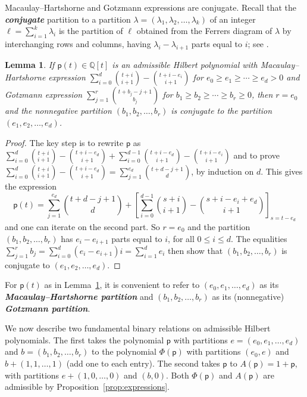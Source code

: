 \documentclass[12pt]{amsart}%
\newtheorem{lemma}[theorem]{Lemma}
\theoremstyle{definition}%
\newcommand{\hp}{\mathsf{p}}%
\newcommand{\lift}{\Phi}%
\newcommand{\plus}{A}%
\newcommand{\QQ}{\mathbb{Q}}%
\begin{document}
Macaulay--Hartshorne and Gotzmann expressions are conjugate.  Recall
that the \emph{\bfseries conjugate} partition to a partition
$\lambda = \left( \lambda_1, \lambda_2, \dotsc, \lambda_k \right)$ of
an integer $\ell = \sum_{i=1}^k \lambda_i$ is the partition of $\ell$
obtained from the Ferrers diagram of $\lambda$ by interchanging rows
and columns, having $\lambda_i - \lambda_{i+1}$ parts equal to $i$;
see \cite[Section~1.8]{Stanley--2012}.

\begin{lemma}
  \label{lem:dictionary}
  If $\hp(t) \in \QQ[t]$ is an admissible Hilbert polynomial with
  Macaulay--Hartshorne expression
  $\sum_{i=0}^d \binom{t+i}{i+1} - \binom{t+i -e_i}{i+1}$ for
  $e_0 \ge e_1 \ge \dotsb \ge e_d > 0$ and Gotzmann expression
  $\sum_{j=1}^r \binom{t + b_j - j+1}{b_j}$ for
  $b_1 \ge b_2 \ge \dotsb \ge b_r \ge 0$, then $r = e_0$ and the
  nonnegative partition $( b_1, b_2, \dotsc, b_r )$ is conjugate to
  the partition $( e_1, e_2, \dotsc, e_d )$.
\end{lemma}

\begin{proof}
  The key step is to rewrite $\hp$ as $\sum_{i=0}^{d} \binom{t + i}{i
    + 1} - \binom{t + i - e_d}{i + 1} + \sum_{i=0}^{d-1} \binom{t + i
    - e_d}{i + 1} - \binom{t + i - e_i}{i + 1}$ and to prove
  $\sum_{i=0}^{d} \binom{t + i}{i + 1} - \binom{t + i - e_d}{i + 1} =
  \sum_{j=1}^{e_d} \binom{t+d-j+1}{d}$, by induction on $d$.  This
  gives the expression
  \[
  \hp(t) = \sum_{j=1}^{e_d} \binom{t + d - j+1}{d} + \left[
    \sum_{i=0}^{d-1} \binom{s + i}{i + 1} - \binom{s + i - e_i+e_d}{i
      + 1} \right]_{s = t - e_d}
  \]
  and one can iterate on the second part.  So $r = e_0$ and the
  partition $(b_1, b_2, \ldots, b_r)$ has $e_i - e_{i+1}$ parts equal
  to $i$, for all $0 \le i \le d$.  The equalities $\sum_{j=1}^r b_j =
  \sum_{i=0}^d (e_i - e_{i+1})i = \sum_{i=1}^d e_i$ then show that $(
  b_1, b_2, \dotsc, b_r )$ is conjugate to $( e_1, e_2, \dotsc, e_d
  )$.
\end{proof}

For $\hp(t)$ as in Lemma~\ref{lem:dictionary}, it is convenient to
refer to $(e_0, e_1, \dotsc, e_d)$ as its \emph{\bfseries
  Macaulay--Hartshorne partition} and $(b_1, b_2, \dotsc, b_r)$ as its
(nonnegative) \emph{\bfseries Gotzmann partition}.

We now describe two fundamental binary relations on admissible Hilbert
polynomials.  The first takes the polynomial $\hp$ with partitions $e
= (e_0, e_1, \dotsc, e_d)$ and $b = (b_1, b_2, \dotsc, b_r)$ to the
polynomial $\lift (\hp)$ with partitions $(e_0, e)$ and $b + (1, 1,
\ldots, 1)$ (add one to each entry).  The second takes $\hp$ to $\plus
(\hp) = 1 + \hp$, with partitions $e + (1, 0, \ldots, 0)$ and $(b,
0)$.  Both $\lift (\hp)$ and $\plus (\hp)$ are admissible by
Proposition~\ref{prop:expressions}.
\end{document}
